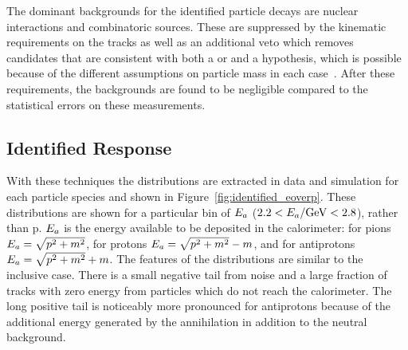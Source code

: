 The dominant backgrounds for the identified particle decays are nuclear interactions and combinatoric sources.
These are suppressed by the kinematic requirements on the tracks as well as an additional veto which removes candidates that are consistent with both a \pL or \pLB and a \pKS hypothesis, which is possible because of the different assumptions on particle mass in each case~\cite{PERF-2011-05}.
After these requirements, the backgrounds are found to be negligible compared to the statistical errors on these measurements. 

\subsection{Identified Response}
With these techniques the \ep distributions are extracted in data and simulation for each particle species and shown in Figure~\ref{fig:identified_eoverp}. 
These distributions are shown for a particular bin of $E_a$ ($2.2 < E_a / \mathrm{Ge\kern -0.05em V} < 2.8$),  rather than p. 
$E_a$ is the energy available to be deposited in the calorimeter: for pions $E_a = \sqrt{p^2 + m^2}$, for protons $E_a = \sqrt{p^2 + m^2} - m$, and for antiprotons $E_a = \sqrt{p^2 + m^2} + m$.
The features of the \ep distributions are similar to the inclusive case.
There is a small negative tail from noise and a large fraction of tracks with zero energy from particles which do not reach the calorimeter.
The long positive tail is noticeably more pronounced for antiprotons because of the additional energy generated by the annihilation in addition to the neutral background. 

